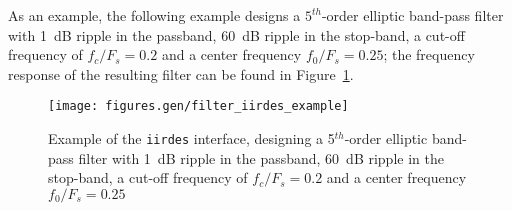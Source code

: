 %
As an example, the following example designs a $5^{th}$-order elliptic
band-pass filter with
1~dB ripple in the passband,
60~dB ripple in the stop-band,
a cut-off frequency of $f_c/F_s=0.2$
and a center frequency $f_0/F_s=0.25$;
the frequency response of the resulting filter can be found in
Figure~\ref{fig:module:filter:iirdes_example}.
%

%
%
\begin{figure}
\centering
  \texttt{[image: figures.gen/filter\_iirdes\_example]}
\caption{Example of the {\tt iirdes} interface, designing a
         5$^{th}$-order elliptic band-pass filter with
         1~dB ripple in the passband,
         60~dB ripple in the stop-band,
         a cut-off frequency of $f_c/F_s=0.2$
         and a center frequency $f_0/F_s=0.25$}
\label{fig:module:filter:iirdes_example}
\end{figure}

